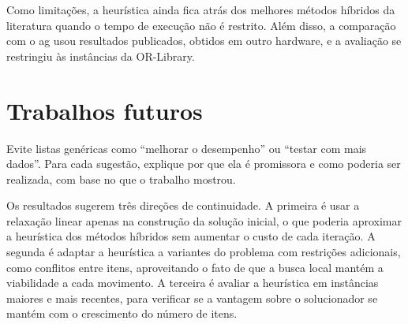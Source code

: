 Como limitações, a heurística ainda fica atrás dos melhores métodos híbridos
da literatura quando o tempo de execução não é restrito. Além disso, a
comparação com o \acs{ag} usou resultados publicados, obtidos em outro
hardware, e a avaliação se restringiu às instâncias da OR-Library.

\section{Trabalhos futuros}
\label{sec:conclusao:futuros}

\begin{instrucao}
Evite listas genéricas como ``melhorar o desempenho'' ou ``testar com mais
dados''. Para cada sugestão, explique por que ela é promissora e como poderia
ser realizada, com base no que o trabalho mostrou.
\end{instrucao}

Os resultados sugerem três direções de continuidade. A primeira é usar a
relaxação linear apenas na construção da solução inicial, o que poderia
aproximar a heurística dos métodos híbridos sem aumentar o custo de cada
iteração. A segunda é adaptar a heurística a variantes do problema com
restrições adicionais, como conflitos entre itens, aproveitando o fato de que
a busca local mantém a viabilidade a cada movimento. A terceira é avaliar a
heurística em instâncias maiores e mais recentes, para verificar se a
vantagem sobre o solucionador se mantém com o crescimento do número de itens.
